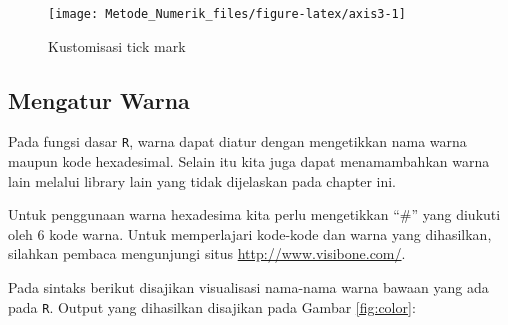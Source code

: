 \documentclass[
]{book}
\theoremstyle{definition}
\theoremstyle{definition}
\theoremstyle{definition}
\theoremstyle{definition}
\theoremstyle{remark}
\begin{document}
\begin{figure}

{\centering \texttt{[image: Metode\_Numerik\_files/figure-latex/axis3-1]} 

}

\caption{Kustomisasi tick mark}\label{fig:axis3}
\end{figure}

\hypertarget{changecolor}{%
\subsection{Mengatur Warna}\label{changecolor}}

Pada fungsi dasar \texttt{R}, warna dapat diatur dengan mengetikkan nama warna maupun kode hexadesimal. Selain itu kita juga dapat menamambahkan warna lain melalui library lain yang tidak dijelaskan pada chapter ini.

Untuk penggunaan warna hexadesima kita perlu mengetikkan ``\#'' yang diukuti oleh 6 kode warna. Untuk memperlajari kode-kode dan warna yang dihasilkan, silahkan pembaca mengunjungi situs \url{http://www.visibone.com/}.

Pada sintaks berikut disajikan visualisasi nama-nama warna bawaan yang ada pada \texttt{R}. Output yang dihasilkan disajikan pada Gambar \ref{fig:color}:
\end{document}
